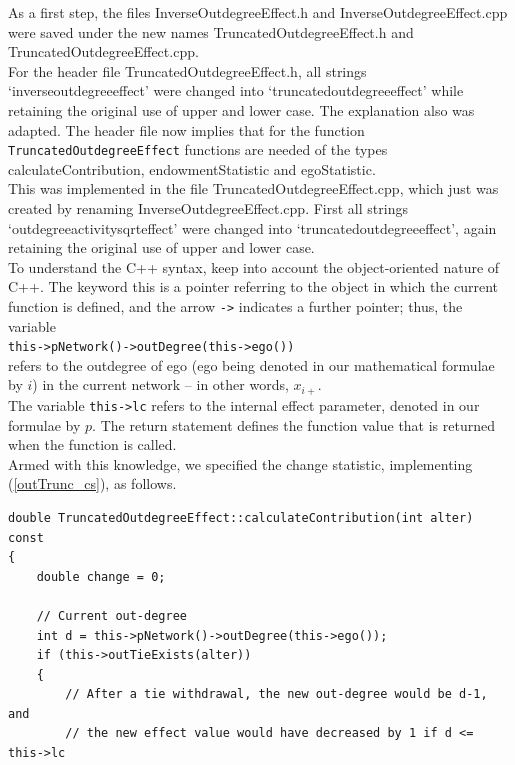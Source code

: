\documentclass[a4paper,fleqn,11pt]{article}
\newcommand{\+}{\, + \,}
\newcommand{\sfn}[1]{\textsf{#1}}
\begin{document}
\begin{enumerate}
      As a first step,   the files \textsf{InverseOutdegreeEffect.h} and
      \textsf{InverseOutdegreeEffect.cpp} were saved under the new names
      \textsf{TruncatedOutdegreeEffect.h} and
      \textsf{TruncatedOutdegreeEffect.cpp}.
      \\
      For the header file \textsf{TruncatedOutdegreeEffect.h}, all strings
      `inverseoutdegreeeffect'
      were changed into `truncatedoutdegreeeffect' while retaining the original
      use of upper and lower case.
      The explanation also was adapted.
      The header file now implies that for the function
      \texttt{TruncatedOutdegreeEffect}
      functions are needed of the types \sfn{calculateContribution},
      \sfn{endowmentStatistic} and \sfn{egoStatistic}.
      \\
      This was implemented in the file \textsf{TruncatedOutdegreeEffect.cpp},
      which just was created by renaming \textsf{InverseOutdegreeEffect.cpp}.
      First  all strings `outdegreeactivitysqrteffect'
      were changed into `truncatedoutdegreeeffect', again retaining the original
      use of upper and lower case.\\
      To understand the C++ syntax, keep into account
      the object-oriented nature of C++.
      The keyword \sfn{this} is a pointer referring to the object
      in which the current function is defined, and the arrow \texttt{->}
      indicates a further pointer; thus, the variable\\
      \texttt{this->pNetwork()->outDegree(this->ego())}\\
      refers to the outdegree of ego (ego being denoted in our mathematical
      formulae by $i$) in the current network -- in other words,
      $x_{i+}$.\\
      The variable \texttt{this->lc} refers to the
      internal effect parameter, denoted in our formulae by $p$.
      The \sfn{return} statement defines the function value that is returned
      when the function is called.
      \\
      Armed with this knowledge, we specified the change statistic,
      implementing (\ref{outTrunc_cs}), as follows.

{\small
\begin{verbatim}
double TruncatedOutdegreeEffect::calculateContribution(int alter) const
{
    double change = 0;

    // Current out-degree
    int d =	this->pNetwork()->outDegree(this->ego());
    if (this->outTieExists(alter))
    {
        // After a tie withdrawal, the new out-degree would be d-1, and
        // the new effect value would have decreased by 1 if d <= this->lc


\end{verbatim}}
\end{enumerate}
\end{document}
